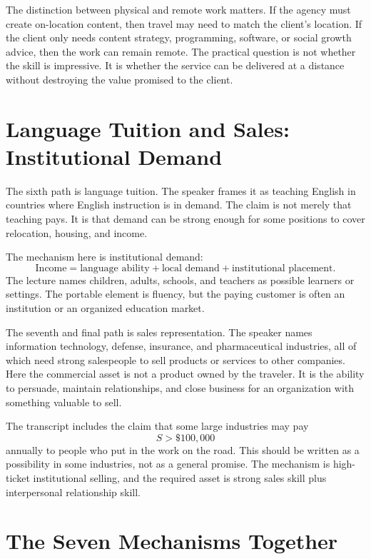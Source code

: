 The distinction between physical and remote work matters. If the agency must create on-location content, then travel may need to match the client's location. If the client only needs content strategy, programming, software, or social growth advice, then the work can remain remote. The practical question is not whether the skill is impressive. It is whether the service can be delivered at a distance without destroying the value promised to the client.

\section{Language Tuition and Sales: Institutional Demand}

The sixth path is language tuition. The speaker frames it as teaching English in countries where English instruction is in demand. The claim is not merely that teaching pays. It is that demand can be strong enough for some positions to cover relocation, housing, and income.

The mechanism here is institutional demand:
\begin{equation}
\text{Income}
=
\text{language ability}
+
\text{local demand}
+
\text{institutional placement}.
\end{equation}
The lecture names children, adults, schools, and teachers as possible learners or settings. The portable element is fluency, but the paying customer is often an institution or an organized education market.

The seventh and final path is sales representation. The speaker names information technology, defense, insurance, and pharmaceutical industries, all of which need strong salespeople to sell products or services to other companies. Here the commercial asset is not a product owned by the traveler. It is the ability to persuade, maintain relationships, and close business for an organization with something valuable to sell.

The transcript includes the claim that some large industries may pay
\begin{equation}
S > \$100{,}000
\end{equation}
annually to people who put in the work on the road. This should be written as a possibility in some industries, not as a general promise. The mechanism is high-ticket institutional selling, and the required asset is strong sales skill plus interpersonal relationship skill.

\section{The Seven Mechanisms Together}

